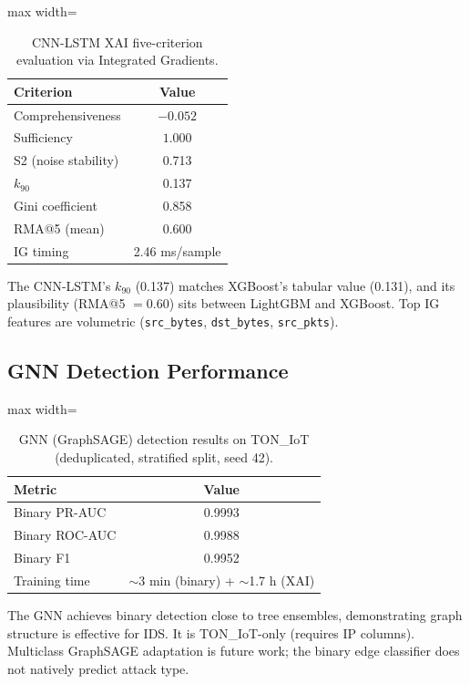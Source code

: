 \documentclass[12pt,a4paper]{report}
\begin{document}
\begin{table}[H]
\centering
\caption{CNN-LSTM XAI five-criterion evaluation via Integrated Gradients.}
\label{tab:cnnlstm-xai}
\begin{adjustbox}{max width=\textwidth}
\begin{tabular}{lc}
\toprule
\textbf{Criterion} & \textbf{Value} \\
\midrule
Comprehensiveness & $-0.052$ \\
Sufficiency & $1.000$ \\
S2 (noise stability) & 0.713 \\
$k_{90}$ & 0.137 \\
Gini coefficient & 0.858 \\
RMA@5 (mean) & 0.600 \\
IG timing & 2.46 ms/sample \\
\bottomrule
\end{tabular}
\end{adjustbox}
\end{table}

The CNN-LSTM's $k_{90}$ (0.137) matches XGBoost's tabular value (0.131), and its plausibility (RMA@5 $= 0.60$) sits between LightGBM and XGBoost. Top IG features are volumetric (\texttt{src\_bytes}, \texttt{dst\_bytes}, \texttt{src\_pkts}).

\subsection{GNN Detection Performance}
\label{sec:gnn-results}

\begin{table}[H]
\centering
\caption{GNN (GraphSAGE) detection results on TON\_IoT (deduplicated, stratified split, seed 42).}
\label{tab:gnn}
\begin{adjustbox}{max width=\textwidth}
\begin{tabular}{lc}
\toprule
\textbf{Metric} & \textbf{Value} \\
\midrule
Binary PR-AUC & 0.9993 \\
Binary ROC-AUC & 0.9988 \\
Binary F1 & 0.9952 \\
Training time & $\sim$3 min (binary) + $\sim$1.7 h (XAI) \\
\bottomrule
\end{tabular}
\end{adjustbox}
\end{table}

The GNN achieves binary detection close to tree ensembles, demonstrating graph structure is effective for IDS. It is TON\_IoT-only (requires IP columns). Multiclass GraphSAGE adaptation is future work; the binary edge classifier does not natively predict attack type.
\end{document}
